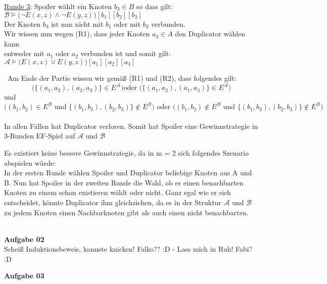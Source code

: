 \documentclass[a4paper,10pt]{article}
\begin{document}
\begin{compactenum} [(a)]
\begin{tabbing}
			\underline{Runde 3}: Spoiler wählt ein Knoten $ b_3 \in B $ so dass gilt:\\
			\> $ \mathcal{B} \models \big(\lnot E(x,z) \wedge \lnot E(y,z)\big) [b_1][b_2][b_3] $\\
			\> Der Knoten $ b_3 $ ist nun nicht mit $ b_1 $ oder mit $ b_2 $ verbunden.\\
			\> Wir wissen nun wegen (R1), dass jeder Knoten $ a_3 \in A $ den Duplicator wählen kann \\
			\> entweder mit $ a_1 $ oder $ a_2 $ verbunden ist und somit gilt: \\
			\> $\mathcal{A} \models \big(E(x,z) \vee E(y,z)\big) [a_1][a_2][a_3]$\\
		\end{tabbing}\
		Am Ende der Partie wissen wir gemäß (R1) und (R2), dass folgendes gilt:\\
		\[ \big(\{(a_1,a_2),(a_2,a_3)\}\in E^\mathcal{A}\big)  \text{oder } \big(\{(a_1,a_2),(a_1,a_3)\}\in E^\mathcal{A}\big) \] 
		und\\
		\[ \big((b_1,b_2)\in E^\mathcal{B} \text{ und } \{(b_1,b_3),(b_2,b_3)\} \not\in E^\mathcal{B}\big) \text{ oder }  \big((b_1,b_2)\not\in E^\mathcal{B} \text{ und } \{(b_1,b_3),(b_2,b_3)\} \not\in E^\mathcal{B}\big) \]\\
		
		In allen Fällen hat Duplicator verloren. Somit hat Spoiler eine Gewinnstrategie in 3-Runden EF-Spiel auf $\mathcal{A}$ und $\mathcal{B}$\\
		
		\item Es existiert keine bessere Gewinnstrategie, da in m = 2 sich folgendes Szenario abspielen würde:\\
		In der ersten Runde wählen Spoiler und Duplicator beliebige Knoten aus A und B. Nun hat Spoiler in der zweiten Runde die Wahl, ob er einen benachbarten Knoten zu einem schon existieren wählt oder nicht. Ganz egal wie er sich entscheidet, könnte Duplicator ihm gleichziehen, da es in der Struktur $ \mathcal{A} $ und $ \mathcal{B} $ zu jedem Knoten einen Nachbarknoten gibt als auch einen nicht benachbarten. 
	\end{compactenum}\ \\
	
	\textbf{Aufgabe 02}\\
	Scheiß Induktionsbeweis, kannste knicken! Falko?? :D - Lass mich in Ruh! Fabi? :D
	
	\newpage

	\textbf{Aufgabe 03}\\
	
\end{document}

